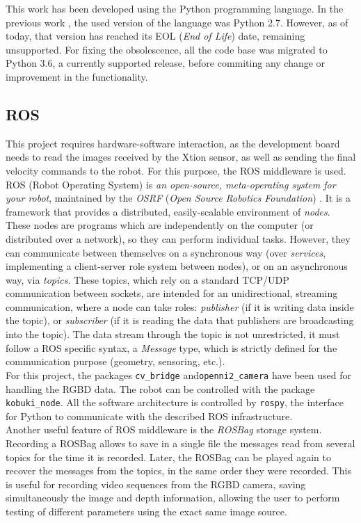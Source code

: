 This work has been developed using the Python programming language. In the previous work \cite{tfg}, the used version of the language was Python 2.7. However, as of today, that version has reached its EOL (\textit{End of Life}) date, remaining unsupported. For fixing the obsolescence, all the code base was migrated to Python 3.6, a currently supported release, before commiting any change or improvement in the functionality.


\subsection{ROS}
This project requires hardware-software interaction, as the development board needs to read the images received by the Xtion sensor, as well as sending the final velocity commands to the robot. For this purpose, the ROS middleware is used. ROS (Robot Operating System) is \textit{an open-source, meta-operating system for your robot}, maintained by the \emph{OSRF} (\textit{Open Source Robotics Foundation}) \cite{ros-intro}. It is a framework that provides a distributed, easily-scalable environment of \emph{nodes}. These nodes are programs which are independently on the computer (or distributed over a network), so they can perform individual tasks. However, they can communicate between themselves on a synchronous way (over \emph{services}, implementing a client-server role system between nodes), or on an asynchronous way, via \textit{topics}. These topics, which rely on a standard TCP/UDP communication between sockets, are intended for an unidirectional, streaming communication, where a node can take roles: \emph{publisher} (if it is writing data inside the topic), or \emph{subscriber} (if it is reading the data that publishers are broadcasting into the topic). The data stream through the topic is not unrestricted, it must follow a ROS specific syntax, a \emph{Message} type, which is strictly defined for the communication purpose (geometry, sensoring, etc.).\\

For this project, the packages \texttt{cv\_bridge} and\texttt{openni2\_camera} have been used for handling the RGBD data. The robot can be controlled with the package \texttt{kobuki\_node}. All the software architecture is controlled by \texttt{rospy}, the interface for Python to communicate with the described ROS infrastructure.\\

Another useful feature of ROS middleware is the \textit{ROSBag} storage system. Recording a ROSBag allows to save in a single file the messages read from several topics for the time it is recorded. Later, the ROSBag can be played again to recover the messages from the topics, in the same order they were recorded. This is useful for recording video sequences from the RGBD camera, saving simultaneously the image and depth information, allowing the user to perform testing of different parameters using the exact same image source.\\

